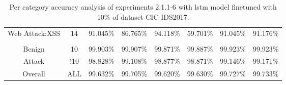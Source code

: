 \begin{table}[htb]
{\begin{tabular}{@{}cccccccc@{}}
        Web Attack:XSS &  14 &  91.045\% &  86.765\% &  94.118\% &  59.701\% &  91.045\% &  91.176\% \\
         \\
        Benign &  10 &  99.903\% &  99.907\% &  99.871\% &  99.887\% &  99.923\% &  99.923\% \\
        Attack &  !10 &  98.828\% &  99.108\% &  98.877\% &  98.871\% &  99.146\% &  99.171\% \\
        Overall &  ALL &  99.632\% &  99.705\% &  99.620\% &  99.630\% &  99.727\% &  99.733\% \\
        \bottomrule
    \end{tabular}}
    \caption{Per category accuracy analysis of experiments 2.1.1-6 with \gls{lstm} model finetuned with 10\% of dataset CIC-IDS2017.}
    \label{table:results:lstm:class_flows10}
\end{table}